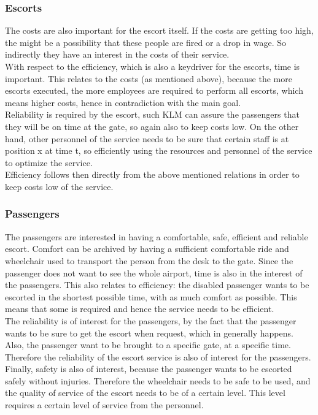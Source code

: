 \documentclass[a4paper, 11pt, notitlepage]{report}
\begin{document}
\subsubsection{Escorts}
The costs are also important for the escort itself. If the costs are getting too high, the might be a possibility that these people are fired or a drop in wage. So indirectly they have an interest in the costs of their service.\\
With respect to the efficiency, which is also a keydriver for the escorts, time is important. This relates to the costs (as mentioned above), because the more escorts executed, the more employees are required to perform all escorts, which means higher costs, hence in contradiction with the main goal. \\
Reliability is required by the escort, such KLM can assure the passengers that they will be on time at the gate, so again also to keep costs low. On the other hand, other personnel of the service needs to be sure that certain staff is at position x at time t, so efficiently using the resources and personnel of the service to optimize the service.\\
Efficiency follows then directly from the above mentioned relations in order to keep costs low of the service.
\subsubsection{Passengers}
The passengers are interested in having a comfortable, safe, efficient and reliable escort. Comfort can be archived by having a sufficient comfortable ride and wheelchair used to transport the person from the desk to the gate. Since the passenger does not want to see the whole airport,  time is also in the interest of the passengers. This also relates to efficiency: the disabled passenger wants to be escorted in the shortest possible time, with as much comfort as possible. This means that some  is required and hence the service needs to be efficient. \\
The reliability is of interest for the passengers, by the fact that
the passenger wants to be sure to get the escort when request, which in generally happens. Also, the passenger want to be brought to a specific gate, at a specific time. Therefore the reliability of the escort service is also of interest for the passengers.\\
Finally, safety is also of interest, because the passenger wants to be escorted safely without injuries. Therefore the wheelchair needs to be safe to be used, and the quality of service of the escort needs to be of a certain level. This level requires a certain level of service from the personnel.
\end{document}
